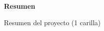 \thispagestyle{empty}
\begin{center}

	\textbf{\huge Resumen }\\[1cm] 

\end{center}



Resumen del proyecto (1 carilla)
